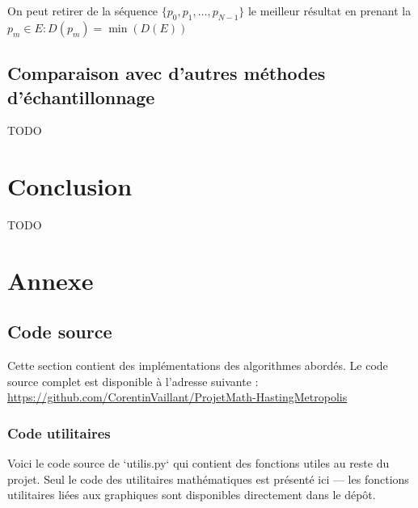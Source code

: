 \documentclass{article}
\begin{document}
On peut retirer de la séquence $\{p_0,p_1, \ldots ,p_{N-1}\}$ le meilleur résultat en prenant la $p_{m} \in E : D(p_{m}) = \min(D(E))$ 


\subsection{Comparaison avec d'autres méthodes d'échantillonnage}

TODO \\

\newpage %
\section{Conclusion}

TODO \\

\newpage
\section{Annexe}

\subsection{Code source}

Cette section contient des implémentations des algorithmes abordés. Le code source complet est disponible à l’adresse suivante : \url{https://github.com/CorentinVaillant/ProjetMath-HastingMetropolis}

\subsubsection{Code utilitaires}

Voici le code source de `utilis.py` qui contient des fonctions utiles au reste du projet. Seul le code des utilitaires mathématiques est présenté ici — les fonctions utilitaires liées aux graphiques sont disponibles directement dans le dépôt.
\end{document}
